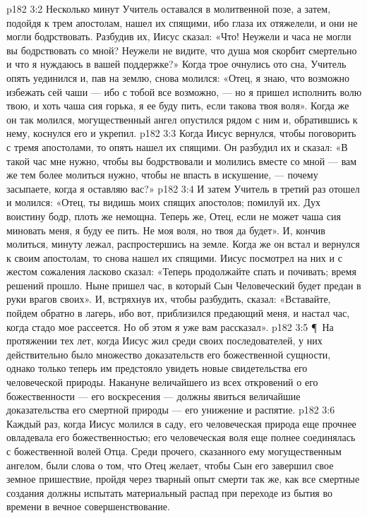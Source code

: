 \vs p182 3:2 Несколько минут Учитель оставался в молитвенной позе, а затем, подойдя к трем апостолам, нашел их спящими, ибо глаза их отяжелели, и они не могли бодрствовать. Разбудив их, Иисус сказал: «Что! Неужели и часа не могли вы бодрствовать со мной? Неужели не видите, что душа моя скорбит смертельно и что я нуждаюсь в вашей поддержке?» Когда трое очнулись ото сна, Учитель опять уединился и, пав на землю, снова молился: «Отец, я знаю, что возможно избежать сей чаши --- ибо с тобой все возможно, --- но я пришел исполнить волю твою, и хоть чаша сия горька, я ее буду пить, если такова твоя воля». Когда же он так молился, могущественный ангел опустился рядом с ним и, обратившись к нему, коснулся его и укрепил.
\vs p182 3:3 Когда Иисус вернулся, чтобы поговорить с тремя апостолами, то опять нашел их спящими. Он разбудил их и сказал: «В такой час мне нужно, чтобы вы бодрствовали и молились вместе со мной --- вам же тем более молиться нужно, чтобы не впасть в искушение, --- почему засыпаете, когда я оставляю вас?»
\vs p182 3:4 И затем Учитель в третий раз отошел и молился: «Отец, ты видишь моих спящих апостолов; помилуй их. Дух воистину бодр, плоть же немощна. Теперь же, Отец, если не может чаша сия миновать меня, я буду ее пить. Не моя воля, но твоя да будет». И, кончив молиться, минуту лежал, распростершись на земле. Когда же он встал и вернулся к своим апостолам, то снова нашел их спящими. Иисус посмотрел на них и с жестом сожаления ласково сказал: «Теперь продолжайте спать и почивать; время решений прошло. Ныне пришел час, в который Сын Человеческий будет предан в руки врагов своих». И, встряхнув их, чтобы разбудить, сказал: «Вставайте, пойдем обратно в лагерь, ибо вот, приблизился предающий меня, и настал час, когда стадо мое рассеется. Но об этом я уже вам рассказал».
\vs p182 3:5 \P\ На протяжении тех лет, когда Иисус жил среди своих последователей, у них действительно было множество доказательств его божественной сущности, однако только теперь им предстояло увидеть новые свидетельства его человеческой природы. Накануне величайшего из всех откровений о его божественности --- его воскресения --- должны явиться величайшие доказательства его смертной природы --- его унижение и распятие.
\vs p182 3:6 Каждый раз, когда Иисус молился в саду, его человеческая природа еще прочнее овладевала его божественностью; его человеческая воля еще полнее соединялась с божественной волей Отца. Среди прочего, сказанного ему могущественным ангелом, были слова о том, что Отец желает, чтобы Сын его завершил свое земное пришествие, пройдя через тварный опыт смерти так же, как все смертные создания должны испытать материальный распад при переходе из бытия во времени в вечное совершенствование.
